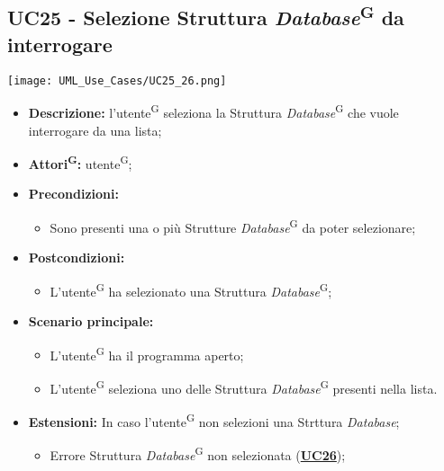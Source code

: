 \subsection{UC25 - Selezione Struttura \textit{Database}\textsuperscript{G} da interrogare}
\label{sec:UC25}
\texttt{[image: UML\_Use\_Cases/UC25\_26.png]}
\begin{itemize}
	\item \textbf{Descrizione:} l’utente\textsuperscript{G} seleziona la Struttura \textit{Database}\textsuperscript{G} che vuole interrogare da una lista;
	\item \textbf{Attori\textsuperscript{G}:} utente\textsuperscript{G};
	\item \textbf{Precondizioni:}
	\begin{itemize}
		\item Sono presenti una o più Strutture \textit{Database}\textsuperscript{G} da poter selezionare;
	\end{itemize}
	\item \textbf{Postcondizioni:}
	\begin{itemize}
		\item L’utente\textsuperscript{G} ha selezionato una Struttura \textit{Database}\textsuperscript{G};
	\end{itemize}
	\item \textbf{Scenario principale:}
	\begin{itemize}
		\item L’utente\textsuperscript{G} ha il programma aperto;
		\item L’utente\textsuperscript{G} seleziona uno delle Struttura \textit{Database}\textsuperscript{G} presenti nella lista.
	\end{itemize}
	\item \textbf{Estensioni:} In caso l'utente\textsuperscript{G} non selezioni una Strttura \textit{Database};
	\begin{itemize}
		\item Errore Struttura \textit{Database}\textsuperscript{G} non selezionata (\hyperref[sec:UC26]{\textbf{UC26}});
	\end{itemize}
\end{itemize}

